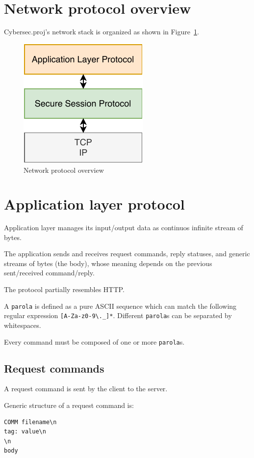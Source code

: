 \documentclass[a4paper,12pt]{article}
\newcommand{\projectname}{Cybersec.proj}
\begin{document}
\section{Network protocol overview}
\projectname{}'s network stack is organized as shown in Figure~\ref{img:protocol}.

\begin{figure}[H]
  \centering
  \includegraphics{img/protocol.pdf}
  \caption{Network protocol overview}
  \label{img:protocol}
\end{figure}

\section{Application layer protocol}
Application layer manages its input/output data as continuos infinite stream of bytes.

The application sends and receives request commands, reply statuses, and generic streams of bytes (the body), whose meaning depends on the previous sent/received command/reply.

The protocol partially resembles HTTP.

A \texttt{parola} is defined as a pure ASCII sequence which can match the following regular expression \texttt{[A-Za-z0-9\textbackslash.\_]*}.
Different \texttt{parola}s can be separated by whitespaces.

Every command must be composed of one or more \texttt{parola}s.

\subsection{Request commands}
A request command is sent by the client to the server.

Generic structure of a request command is:
\begin{verbatim}
COMM filename\n
tag: value\n
\n
body
\end{verbatim}
\end{document}
